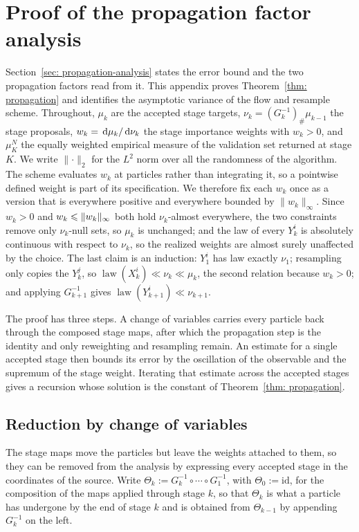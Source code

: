 \documentclass{article}
\begin{document}
\section{Proof of the propagation factor analysis}
\label{sec: appendix-propagation}

Section~\ref{sec: propagation-analysis} states the error bound and the two propagation factors read from it. This appendix proves Theorem~\ref{thm: propagation} and identifies the asymptotic variance of the flow and resample scheme. Throughout, $\mu_k$ are the accepted stage targets, $\nu_k=(G_k^{-1})_{\#}\mu_{k-1}$ the stage proposals, $w_k=\,\mathrm d\mu_k/\,\mathrm d\nu_k$ the stage importance weights with $w_k>0$, and $\mu_K^N$ the equally weighted empirical measure of the validation set returned at stage $K$. We write $\lVert\cdot\rVert_2$ for the $L^2$ norm over all the randomness of the algorithm. The scheme evaluates $w_k$ at particles rather than integrating it, so a pointwise defined weight is part of its specification. We therefore fix each $w_k$ once as a version that is everywhere positive and everywhere bounded by $\lVert w_k\rVert_\infty$. Since $w_k>0$ and $w_k\leqslant\lVert w_k\rVert_\infty$ both hold $\nu_k$-almost everywhere, the two constraints remove only $\nu_k$-null sets, so $\mu_k$ is unchanged; and the law of every $Y_k^i$ is absolutely continuous with respect to $\nu_k$, so the realized weights are almost surely unaffected by the choice. The last claim is an induction: $Y_1^i$ has law exactly $\nu_1$; resampling only copies the $Y_k^j$, so $\operatorname{law}(X_k^i)\ll\nu_k\ll\mu_k$, the second relation because $w_k>0$; and applying $G_{k+1}^{-1}$ gives $\operatorname{law}(Y_{k+1}^i)\ll\nu_{k+1}$.

The proof has three steps. A change of variables carries every particle back through the composed stage maps, after which the propagation step is the identity and only reweighting and resampling remain. An estimate for a single accepted stage then bounds its error by the oscillation of the observable and the supremum of the stage weight. Iterating that estimate across the accepted stages gives a recursion whose solution is the constant of Theorem~\ref{thm: propagation}.

\subsection{Reduction by change of variables}
\label{subsec: appendix-pullback}

The stage maps move the particles but leave the weights attached to them, so they can be removed from the analysis by expressing every accepted stage in the coordinates of the source. Write $\Theta_k := G_k^{-1}\circ\cdots\circ G_1^{-1}$, with $\Theta_0 := \mathrm{id}$, for the composition of the maps applied through stage $k$, so that $\Theta_k$ is what a particle has undergone by the end of stage $k$ and is obtained from $\Theta_{k-1}$ by appending $G_k^{-1}$ on the left.
\end{document}
